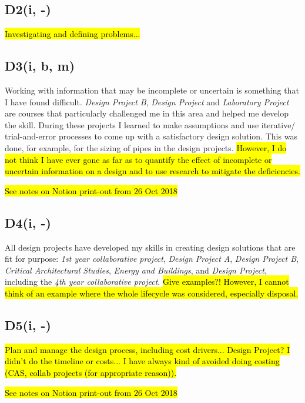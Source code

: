 \subsection*{D2(i, -)}

\hl{Investigating and defining problems...}


\subsection*{D3(i, b, m)}

Working with information that may be incomplete or uncertain is something that I have found difficult.
\textit{Design Project B}, \textit{Design Project} and \textit{Laboratory Project} are courses that particularly challenged me in this area and helped me develop the skill.
During these projects I learned to make assumptions and use iterative/ trial-and-error processes to come up with a satisfactory design solution.
This was done, for example, for the sizing of pipes in the design projects.
\hl{However, I do not think I have ever gone as far as to quantify the effect of incomplete or uncertain information on a design and to use research to mitigate the deficiencies.}

\hl{See notes on Notion print-out from 26 Oct 2018}


\subsection*{D4(i, -)}

All design projects have developed my skills in creating design solutions that are fit for purpose:
\textit{1st year collaborative project},
\textit{Design Project A},
\textit{Design Project B},
\textit{Critical Architectural Studies},
\textit{Energy and Buildings},
and \textit{Design Project}, including the \textit{4th year collaborative project}.
\hl{Give examples?!
However, I cannot think of an example where the whole lifecycle was considered, especially disposal.}


\subsection*{D5(i, -)}

\hl{Plan and manage the design process, including cost drivers...
Design Project? I didn't do the timeline or costs...
I have always kind of avoided doing costing (CAS, collab projects (for appropriate reason)).}

\hl{See notes on Notion print-out from 26 Oct 2018}


